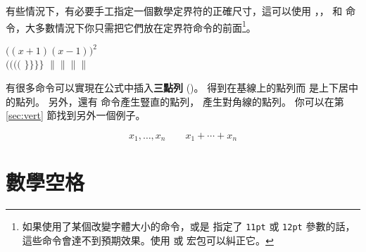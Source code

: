 
有些情況下，有必要手工指定一個數學定界符的正確尺寸，這可以使用 ，， 和
  命令，大多數情況下你只需把它們放在定界符命令的前面\footnote{如果使用了某個改變字體大小的命令，或是
指定了 \texttt{11pt} 或 \texttt{12pt} 參數的話，這些命令會達不到預期效果。使用  或  宏包可以糾正它。}。

\begin{example}
$\Big( (x+1) (x-1) \Big) ^{2}$\\
$\big(\Big(\bigg(\Bigg($\quad
$\big\}\Big\}\bigg\}\Bigg\}$
\quad
$\big\|\Big\|\bigg\|\Bigg\|$
\end{example}



有很多命令可以實現在公式中插入\textbf{三點列} ()。 得到在基線上的點列而  是上下居中的點列。
另外，還有  命令產生豎直的點列， 產生對角線的點列。
你可以在第 \ref{sec:vert} 節找到另外一個例子。
\begin{example}
\begin{displaymath}
x_{1},\ldots,x_{n} \qquad
x_{1}+\cdots+x_{n}
\end{displaymath}
\end{example}

\section{數學空格}

